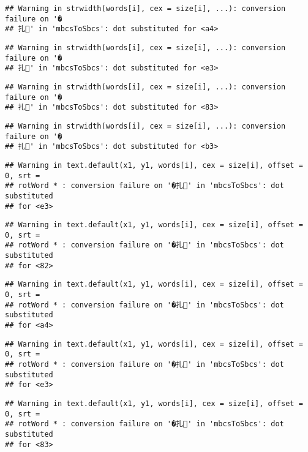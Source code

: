 \documentclass[]{article}
\begin{document}
\begin{verbatim}
## Warning in strwidth(words[i], cex = size[i], ...): conversion failure on '�
## 扎' in 'mbcsToSbcs': dot substituted for <a4>
\end{verbatim}

\begin{verbatim}
## Warning in strwidth(words[i], cex = size[i], ...): conversion failure on '�
## 扎' in 'mbcsToSbcs': dot substituted for <e3>
\end{verbatim}

\begin{verbatim}
## Warning in strwidth(words[i], cex = size[i], ...): conversion failure on '�
## 扎' in 'mbcsToSbcs': dot substituted for <83>
\end{verbatim}

\begin{verbatim}
## Warning in strwidth(words[i], cex = size[i], ...): conversion failure on '�
## 扎' in 'mbcsToSbcs': dot substituted for <b3>
\end{verbatim}

\begin{verbatim}
## Warning in text.default(x1, y1, words[i], cex = size[i], offset = 0, srt =
## rotWord * : conversion failure on '�扎' in 'mbcsToSbcs': dot substituted
## for <e3>
\end{verbatim}

\begin{verbatim}
## Warning in text.default(x1, y1, words[i], cex = size[i], offset = 0, srt =
## rotWord * : conversion failure on '�扎' in 'mbcsToSbcs': dot substituted
## for <82>
\end{verbatim}

\begin{verbatim}
## Warning in text.default(x1, y1, words[i], cex = size[i], offset = 0, srt =
## rotWord * : conversion failure on '�扎' in 'mbcsToSbcs': dot substituted
## for <a4>
\end{verbatim}

\begin{verbatim}
## Warning in text.default(x1, y1, words[i], cex = size[i], offset = 0, srt =
## rotWord * : conversion failure on '�扎' in 'mbcsToSbcs': dot substituted
## for <e3>
\end{verbatim}

\begin{verbatim}
## Warning in text.default(x1, y1, words[i], cex = size[i], offset = 0, srt =
## rotWord * : conversion failure on '�扎' in 'mbcsToSbcs': dot substituted
## for <83>
\end{verbatim}
\end{document}
